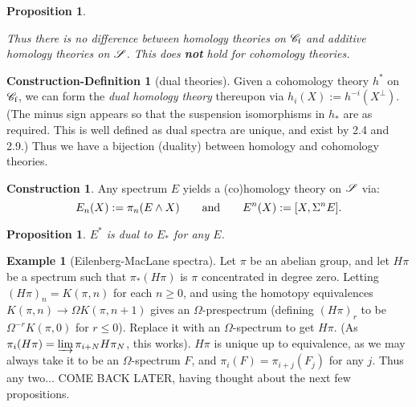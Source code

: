 \documentclass[11pt]{article}
\theoremstyle{plain}
\newtheorem{prop}[thm]{Proposition}
\theoremstyle{definition}
\newtheorem{condef}[thm]{Construction-Definition}
\newtheorem{const}[thm]{Construction}
\newtheorem{exmp}[thm]{Example}
\newcommand{\Specf}{\scrC_\textup{f}}
\begin{document}
{\begin{prop}
\begin{itemise}
\end{itemise}
Thus there is no difference between homology theories on $\Specf$ and additive
homology theories on $\mathscr{S}$. This does \textbf{not} hold for cohomology
theories.
\end{prop}
\begin{condef}[dual theories]
Given a cohomology theory $h^*$ on $\Specf$, we can form the \emph{dual homology
theory} thereupon via $h_i(X):=h^{-i}(X^\perp)$. (The minus sign appears so that
the suspension isomorphisms in $h_*$ are as required. This is well defined as
dual spectra are unique, and exist by 2.4 and 2.9.) Thus we have a bijection
(duality) between homology and cohomology theories.
\end{condef}
\begin{const}%
Any spectrum $E$ yields a (co)homology theory on $\mathscr{S}$ via:
\[E_n(X):=\pi_n(E\wedge X)\text{\qquad and\qquad}E^n(X):=[X,\Sigma^nE].\]
\end{const}
\begin{prop}
$E^*$ is dual to $E_*$ for any $E$.
\end{prop}
\begin{exmp}[Eilenberg-MacLane spectra]
Let $\pi$ be an abelian group, and let $H\pi$ be a spectrum such that
$\pi_*(H\pi)$ is $\pi$ concentrated in degree zero. Letting $(H\pi)_n=K(\pi,n)$
for each $n\geq0$, and using the homotopy equivalences $K(\pi,n)\to\Omega
K(\pi,n+1)$ gives an $\Omega$-prespectrum (defining $(H\pi)_{r}$ to be
$\Omega^{-r}K(\pi,0)$ for $r\leq0$). Replace it with an $\Omega$-spectrum to get
$H\pi$. (As $\pi_i(H\pi)=\varinjlim \pi_{i+N}H\pi_N$, this works). $H\pi$ is
unique up to equivalence, as we may always take it to be an $\Omega$-spectrum
$F$, and $\pi_i(F)=\pi_{i+j}(F_j)$ for any $j$. Thus any two...
COME BACK LATER, having thought about the next few propositions.


\end{exmp}}
\end{document}
